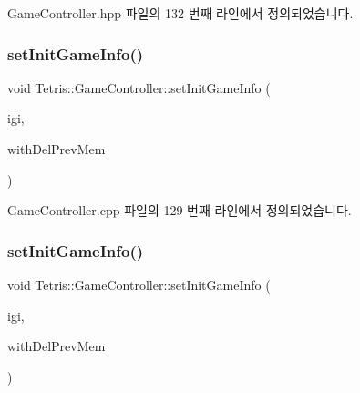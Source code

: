 Game\+Controller.\+hpp 파일의 132 번째 라인에서 정의되었습니다.

\mbox{\label{class_tetris_1_1_game_controller_a0d835f535b48529ca536115dd8123099}} 
\subsubsection{\texorpdfstring{set\+Init\+Game\+Info()}{setInitGameInfo()}\hspace{0.1cm}{\footnotesize\ttfamily [1/2]}}
{\footnotesize\ttfamily void Tetris\+::\+Game\+Controller\+::set\+Init\+Game\+Info (\begin{DoxyParamCaption}\item[{\hyperlink{class_tetris_1_1_init_game_info}{Init\+Game\+Info} $\ast$}]{igi,  }\item[{bool}]{with\+Del\+Prev\+Mem }\end{DoxyParamCaption})}



Game\+Controller.\+cpp 파일의 129 번째 라인에서 정의되었습니다.

\mbox{\label{class_tetris_1_1_game_controller_a0d835f535b48529ca536115dd8123099}} 
\subsubsection{\texorpdfstring{set\+Init\+Game\+Info()}{setInitGameInfo()}\hspace{0.1cm}{\footnotesize\ttfamily [2/2]}}
{\footnotesize\ttfamily void Tetris\+::\+Game\+Controller\+::set\+Init\+Game\+Info (\begin{DoxyParamCaption}\item[{\hyperlink{class_tetris_1_1_init_game_info}{Init\+Game\+Info} $\ast$}]{igi,  }\item[{bool}]{with\+Del\+Prev\+Mem }\end{DoxyParamCaption})\hspace{0.3cm}{\ttfamily [inline]}}



